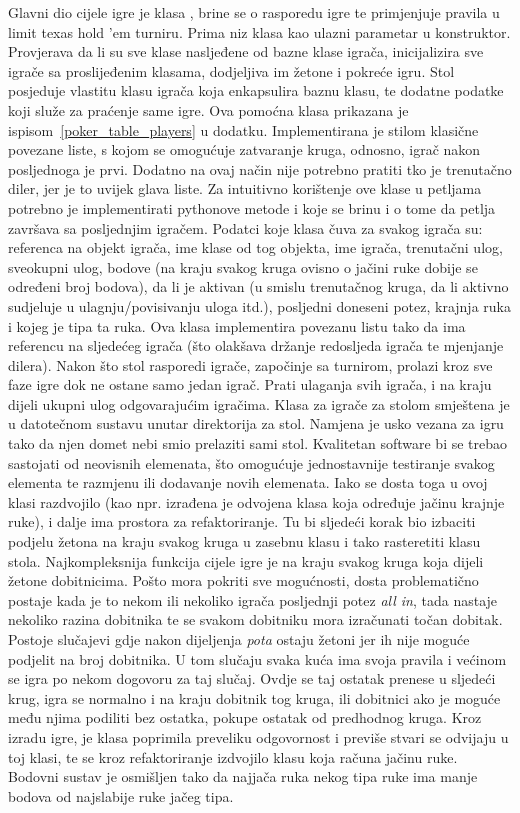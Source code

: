 Glavni dio cijele igre je klasa , brine se o rasporedu igre te primjenjuje pravila u limit texas hold 'em turniru. Prima niz klasa kao ulazni parametar u konstruktor. Provjerava da li su sve klase nasljeđene od bazne klase igrača, inicijalizira sve igrače sa proslijeđenim klasama, dodjeljiva im žetone i pokreće igru. Stol posjeduje vlastitu klasu igrača koja enkapsulira baznu klasu, te dodatne podatke koji služe za praćenje same igre. Ova pomoćna klasa prikazana je ispisom~\ref{poker_table_players} u dodatku. Implementirana je stilom klasične povezane liste, s kojom se omogućuje zatvaranje kruga, odnosno, igrač nakon posljednoga je prvi. Dodatno na ovaj način nije potrebno pratiti tko je trenutačno diler, jer je to uvijek glava liste. Za intuitivno korištenje ove klase u petljama potrebno je implementirati pythonove metode  i  koje se brinu i o tome da petlja završava sa posljednjim igračem. Podatci koje klasa čuva za svakog igrača su: referenca na objekt igrača, ime klase od tog objekta, ime igrača, trenutačni ulog, sveokupni ulog, bodove (na kraju svakog kruga ovisno o jačini ruke dobije se određeni broj bodova), da li je aktivan (u smislu trenutačnog kruga, da li aktivno sudjeluje u ulagnju/povisivanju uloga itd.), posljedni doneseni potez, krajnja ruka i kojeg je tipa ta ruka. Ova klasa implementira povezanu listu tako da ima referencu na sljedećeg igrača (što olakšava držanje redosljeda igrača te mjenjanje dilera). Nakon što stol rasporedi igrače, započinje sa turnirom, prolazi kroz sve faze igre dok ne ostane samo jedan igrač. Prati ulaganja svih igrača, i na kraju dijeli ukupni ulog odgovarajućim igračima. Klasa za igrače za stolom smještena je u datotečnom sustavu unutar direktorija za stol. Namjena je usko vezana za igru tako da njen domet nebi smio prelaziti sami stol. Kvalitetan software bi se trebao sastojati od neovisnih elemenata, što omogućuje jednostavnije testiranje svakog elementa te razmjenu ili dodavanje novih elemenata. Iako se dosta toga u ovoj klasi razdvojilo (kao npr. izrađena je odvojena klasa koja određuje jačinu krajnje ruke), i dalje ima prostora za refaktoriranje. Tu bi sljedeći korak bio izbaciti podjelu žetona na kraju svakog kruga u zasebnu klasu i tako rasteretiti klasu stola. Najkompleksnija funkcija cijele igre je na kraju svakog kruga koja dijeli žetone dobitnicima. Pošto mora pokriti sve mogućnosti, dosta problematično postaje kada je to nekom ili nekoliko igrača posljednji potez \emph{all in}, tada nastaje nekoliko razina dobitnika te se svakom dobitniku mora izračunati točan dobitak. Postoje slučajevi gdje nakon dijeljenja \emph{pota} ostaju žetoni jer ih nije moguće podjelit na broj dobitnika. U tom slučaju svaka kuća ima svoja pravila i većinom se igra po nekom dogovoru za taj slučaj. Ovdje se taj ostatak prenese u sljedeći krug, igra se normalno i na kraju dobitnik tog kruga, ili dobitnici ako je moguće među njima podiliti bez ostatka, pokupe ostatak od predhodnog kruga. Kroz izradu igre, je klasa  poprimila preveliku odgovornost i previše stvari se odvijaju u toj klasi, te se kroz refaktoriranje izdvojilo klasu koja računa jačinu ruke. Bodovni sustav je osmišljen tako da najjača ruka nekog tipa ruke ima manje bodova od najslabije ruke jačeg tipa. 